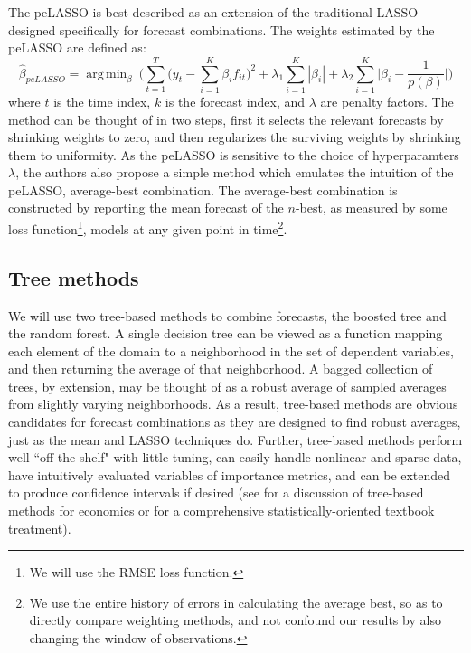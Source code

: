 \documentclass[12pt]{article}
\DeclareMathOperator*{\argmin}{arg\,min} %
\begin{document}
The peLASSO is best described as an extension of the traditional LASSO designed specifically for forecast combinations. The weights estimated by the peLASSO are defined as:
$$ \hat{\beta}_{peLASSO} = \argmin_\beta\ \bigg(\sum^{T}_{t = 1} \bigg(y_t - \sum^{K}_{i = 1} \beta_i f_{it}\bigg)^2 + \lambda_1 \sum^{K}_{i = 1} |\beta_i|  + \lambda_2 \sum^{K}_{i = 1} \bigg|\beta_i - {\frac{1}{p(\beta)}}\bigg|\bigg)$$
where $t$ is the time index, $k$ is the forecast index, and $\lambda$ are penalty factors. The method can be thought of in two steps, first it selects the relevant forecasts by shrinking weights to zero, and then regularizes the surviving weights by shrinking them to uniformity. As the peLASSO is sensitive to the choice of hyperparamters $\lambda$, the authors also propose a simple method which emulates the intuition of the peLASSO, average-best combination. The average-best combination is constructed by reporting the mean forecast of the $n$-best, as measured by some loss function\footnote{We will use the RMSE loss function.}, models at any given point in time\footnote{We use the entire history of errors in calculating the average best, so as to directly compare weighting methods, and not confound our results by also changing the window of observations.}.

\subsection{Tree methods}
We will use two tree-based methods to combine forecasts, the boosted tree and the random forest. A single decision tree can be viewed as a function mapping each element of the domain to a neighborhood in the set of dependent variables, and then returning the average of that neighborhood. A bagged collection of trees, by extension, may be thought of as a robust average of sampled averages from slightly varying neighborhoods. As a result, tree-based methods are obvious candidates for forecast combinations as they are designed to find robust averages, just as the mean and LASSO techniques do. Further, tree-based methods perform well ``off-the-shelf" with little tuning, can easily handle nonlinear and sparse data, have intuitively evaluated variables of importance metrics, and can be extended to produce confidence intervals if desired (see \cite{AtheyImbens2019} for a discussion of tree-based methods for economics or \cite{ElementsOfStatisticalLearning} for a comprehensive statistically-oriented textbook treatment).
\end{document}
